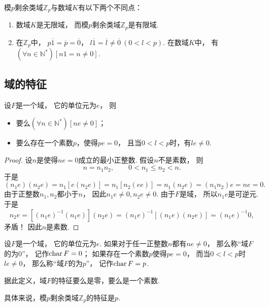 模\(p\)剩余类域\(\mathbb{Z}_p\)与数域\(K\)有以下两个不同点：
\begin{enumerate}
	\item 数域\(K\)是无限域，
	而模\(p\)剩余类域\(\mathbb{Z}_p\)是有限域.

	\item 在\(\mathbb{Z}_p\)中，
	\(p\overline1
	=\overline{p}
	=\overline0\)，
	\(l\overline1
	=\overline{l}
	\neq\overline0\ (0<l<p)\).
	在数域\(K\)中，
	有\((\forall n\in\mathbb{N}^*)[n1=n\neq0]\).
\end{enumerate}

\subsection{域的特征}
\begin{theorem}
设\(F\)是一个域，
它的单位元为\(e\)，
则\begin{itemize}
	\item 要么\((\forall n\in\mathbb{N}^*)[ne\neq0]\)；
	\item 要么存在一个素数\(p\)，使得\(pe=0\)，
	且当\(0<l<p\)时，有\(le\neq0\).
\end{itemize}
\begin{proof}
设\(n\)是使得\(ne=0\)成立的最小正整数.
假设\(n\)不是素数，
则\[
	n=n_1 n_2,
	\qquad
	0<n_1 \leq n_2<n.
\]
于是%
\[
	(n_1 e)(n_2 e)
	=n_1[e(n_2 e)]
	=n_1[n_2(ee)]
	=n_1(n_2 e)
	=(n_1 n_2)e
	=ne=0.
\]
由于正整数\(n_1,n_2\)都小于\(n\)，
因此\(n_1 e\neq0,
n_2 e\neq0\).
由于\(F\)是域，
所以\(n_1 e\)是可逆元.
于是\[
	n_2 e
	=[(n_1 e)^{-1} (n_1 e)](n_2 e)
	=(n_1 e)^{-1}
	[(n_1 e)(n_2 e)]
	=(n_1 e)^{-1} 0,
\]
矛盾！
因此\(n\)是素数.
\end{proof}
\end{theorem}

\begin{definition}
设\(F\)是一个域，
它的单位元为\(e\).
如果对于任一正整数\(n\)都有\(ne\neq0\)，
那么称“域\(F\)的为0”，
记作\(\operatorname{char} F=0\)；
如果存在一个素数\(p\)使得\(pe=0\)，
而当\(0<l<p\)时\(le\neq0\)，
那么称“域\(F\)的为\(p\)”，
记作\(\operatorname{char} F=p\).
\end{definition}

据此定义，域\(F\)的特征要么是零，要么是一个素数.

具体来说，模\(p\)剩余类域\(\mathbb{Z}_p\)的特征是\(p\).

